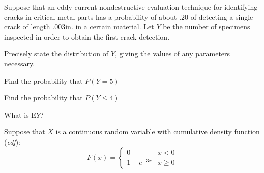 \documentclass[addpoints]{examsetup}
\begin{document}




\examCoverPage

\begin{questions}
\question
Suppose that an eddy current nondestructive evaluation technique for identifying cracks in critical metal parts has a probability of about $.20$ of detecting a single crack of length $.003$in. in a certain material. Let $Y$ be the number of specimens inspected in order to obtain the first crack detection.
\vspace{1cm}
         \begin{subparts}
                  \subpart[2] Precisely state the distribution of $Y$, giving the values of any parameters necessary.
                  \vspace{2cm}
                  
                  \subpart[3] Find the probability that $P(Y = 5)$
                  \hfill {}
                  \vspace{5cm}
                  
                  \subpart[3] Find the probability that $P(Y \le 4)$
                  \hfill {}
                  \vspace{5cm}
                  
                  \subpart[2] What is $\text{E}Y$?
                  \hfill {}
                  \vspace{2cm}
                  
                           
         \end{subparts}
\newpage
\question 

Suppose that $X$ is a continuous random variable with cumulative density function (\emph{cdf}):
$$
F(x) = 
\begin{cases}
    0 &  x < 0 \\
   1 - e^{-3x} &  x \ge 0
\end{cases}
$$

\end{questions}
\end{document}
